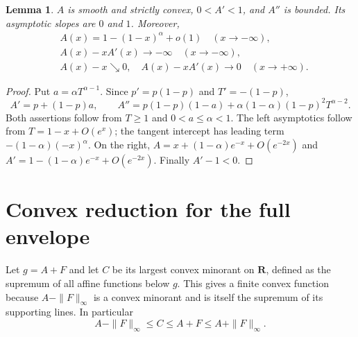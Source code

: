 \documentclass[11pt]{article}
\newtheorem{lemma}[theorem]{Lemma}
\theoremstyle{remark}\newtheorem{remark}[theorem]{Remark}
\begin{document}
\begin{lemma}\label{lem:reference}
$A$ is smooth and strictly convex, $0<A'<1$, and $A''$ is bounded.
Its asymptotic slopes are $0$ and $1$. Moreover,
\[
 \begin{split}
 &A(x)=1-(1-x)^\alpha+o(1)\quad(x\longrightarrow-\infty),\\
 &A(x)-xA'(x)\longrightarrow-\infty\quad(x\longrightarrow-\infty),\\
 &A(x)-x\searrow0,\quad A(x)-xA'(x)\longrightarrow0
       \quad(x\longrightarrow+\infty).
 \end{split}
\]
\end{lemma}
\begin{proof}
Put $a=\alpha T^{\alpha-1}$. Since $p'=p(1-p)$ and $T'=-(1-p)$,
\[
 A'=p+(1-p)a,\qquad
 A''=p(1-p)(1-a)+\alpha(1-\alpha)(1-p)^2T^{\alpha-2}.
\]
Both assertions follow from $T\geq1$ and $0<a\leq\alpha<1$.
The left asymptotics follow from $T=1-x+O(e^x)$; the tangent intercept
has leading term $-(1-\alpha)(-x)^\alpha$.
On the right, $A=x+(1-\alpha)e^{-x}+O(e^{-2x})$ and
$A'=1-(1-\alpha)e^{-x}+O(e^{-2x})$. Finally $A'-1<0$.
\end{proof}

\section{Convex reduction for the full envelope}
Let $g=A+F$ and let $C$ be its largest convex minorant on $\mathbf R$,
defined as the supremum of all affine functions below $g$.
This gives a finite convex function because $A-\|F\|_\infty$ is a
convex minorant and is itself the supremum of its supporting lines.
In particular
\begin{equation}\label{eq:sandwich}
 A-\|F\|_\infty\leq C\leq A+F\leq A+\|F\|_\infty.
\end{equation}
\end{document}
